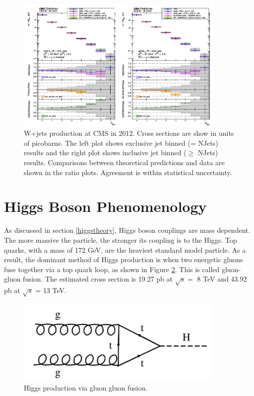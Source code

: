 \documentclass[oneside, letterpaper, oldfontcommands]{memoir}
\begin{document}
\begin{figure}[here]
\includegraphics[width=0.9\textwidth]{wjets8TeV.png}
\caption{W+jets production at CMS in 2012. Cross sections are show in units of picobarns. The left plot shows exclusive jet binned (= NJets) results and the right plot shows inclusive jet binned ($\geq$ NJets) results. Comparisons between theoretical predictions and data are shown in the ratio plots. Agreement is within statistical uncertainty. }
\label{fig:wjets8TeV}
\end{figure}


\section{Higgs Boson Phenomenology}\label{higgspheno}
\qquad As discussed in section \ref{higgstheory}, Higgs boson couplings are mass dependent. The more massive the particle, the stronger its coupling is to the Higgs. Top quarks, with a mass of 172 GeV, are the heaviest standard model particle. As a result, the dominant method of Higgs production is when two energetic gluons fuse together via a top quark loop, as shown in Figure \ref{fig:ggfHiggs}. This is called gluon-gluon fusion. The estimated cross section is 19.27 pb at $\sqrt{s} = $ 8 TeV and 43.92 pb at $\sqrt{s}$ = 13 TeV.

\begin{figure}[here]
\includegraphics[width=0.9\textwidth]{ggfHiggs.jpg}
\caption{Higgs production via gluon gluon fusion.}
\label{fig:ggfHiggs}
\end{figure}
\end{document}
